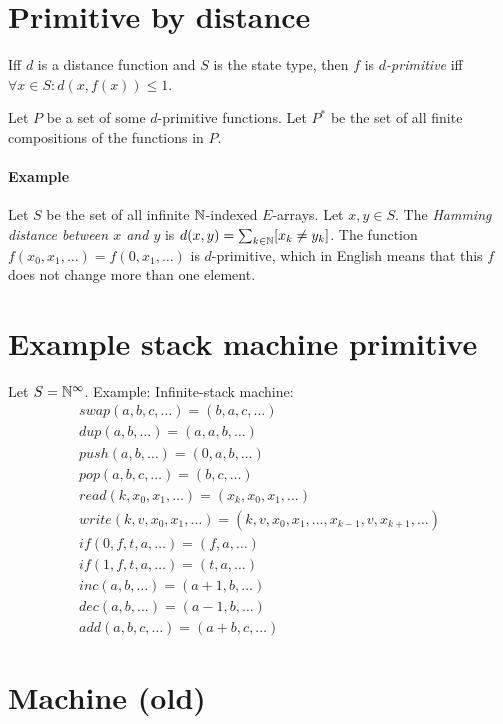 \section{Primitive by distance}

Iff \(d\) is a distance function and \(S\) is the state type,
then \(f\) is \emph{\(d\)-primitive} iff \(\forall x \in S : d(x,f(x)) \le 1\).

Let \(P\) be a set of some \(d\)-primitive functions.
Let \(P^*\) be the set of all finite compositions of the functions in \(P\).

\paragraph{Example}
Let \(S\) be the set of all infinite \(\mathbb{N}\)-indexed \(E\)-arrays.
Let \(x,y \in S\).
The \emph{Hamming distance between \(x\) and \(y\)} is
\(d(x,y) = \sum_{k\in\mathbb{N}} [x_k \neq y_k]\).
The function \(f(x_0,x_1,\ldots) = f(0,x_1,\ldots)\) is \(d\)-primitive,
which in English means that this \(f\) does not change more than one element.

\section{Example stack machine primitive}

Let \(S = \mathbb{N}^\infty\).
Example:
Infinite-stack machine:
\begin{align*}
    swap(a,b,c,\ldots) = (b,a,c,\ldots)
    \\
    dup(a,b,\ldots) = (a,a,b,\ldots)
    \\
    push(a,b,\ldots) = (0,a,b,\ldots)
    \\
    pop(a,b,c,\ldots) = (b,c,\ldots)
    \\
    read(k,x_0,x_1,\ldots) = (x_k,x_0,x_1,\ldots)
    \\
    write(k,v,x_0,x_1,\ldots) = (k,v,x_0,x_1,\ldots,x_{k-1},v,x_{k+1},\ldots)
    \\
    if(0,f,t,a,\ldots) = (f,a,\ldots)
    \\
    if(1,f,t,a,\ldots) = (t,a,\ldots)
    \\
    inc(a,b,\ldots) = (a+1,b,\ldots)
    \\
    dec(a,b,\ldots) = (a-1,b,\ldots)
    \\
    add(a,b,c,\ldots) = (a+b,c,\ldots)
\end{align*}

\section{Machine (old)}

